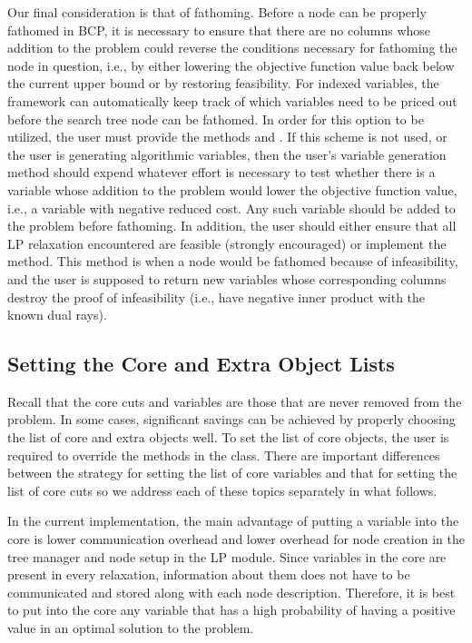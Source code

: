 Our final consideration is that of fathoming. Before a node can be
properly fathomed in BCP, it is necessary to ensure that there are no
columns whose addition to the problem could reverse the conditions
necessary for fathoming the node in question, i.e., by either lowering
the objective function value back below the current upper bound or by
restoring feasibility. For indexed variables, the framework can
automatically keep track of which variables need to be priced out
before the search tree node can be fathomed. In order for this option
to be utilized, the user must provide the methods 
 and . If this scheme
is not used, or the user is generating algorithmic variables, then the
user's variable generation method should expend whatever effort is
necessary to test whether there is a variable whose addition to the
problem would lower the objective function value, i.e., a variable
with negative reduced cost. Any such variable should be added to the
problem before fathoming. In addition, the user should either ensure
that all LP relaxation encountered are feasible (strongly encouraged)
or implement the  method. This method is when a
node would be fathomed because of infeasibility, and the user is supposed to
return new variables whose corresponding columns destroy the proof of
infeasibility (i.e., have negative inner product with the known dual rays).

\subsection{Setting the Core and Extra Object Lists}

Recall that the core cuts and variables are those that are never
removed from the problem. In some cases, significant savings can be
achieved by properly choosing the list of core and extra objects well.
To set the list of core objects, the user is required to override the
 methods in the  class. There are
important differences between the strategy for setting the list of
core variables and that for setting the list of core cuts so we
address each of these topics separately in what follows.

In the current implementation, the main advantage of putting a
variable into the core is lower communication overhead and lower
overhead for node creation in the tree manager and node setup in the
LP module. Since variables in the core are present in every
relaxation, information about them does not have to be communicated
and stored along with each node description. Therefore, it is best to
put into the core any variable that has a high probability of having a
positive value in an optimal solution to the problem.

